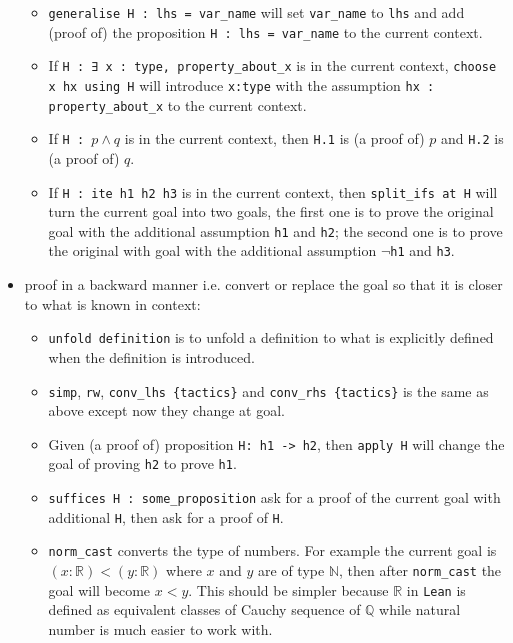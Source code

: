\documentclass{report}
\theoremstyle{definition}
\begin{document}
\begin{itemize}
\begin{itemize}
    \item {\tt \small generalise H : lhs = var\_name} will set {\tt \small var\_name} to {\tt \small lhs} and add (proof of) the proposition {\tt \small H : lhs = var\_name} to the current context.
    \item If {\tt \small H : ∃ x : type, property\_about\_x} is in the current context, {\tt \small choose x hx using H} will introduce {\tt \small x:type} with the assumption {\tt \small hx : property\_about\_x} to the current context. 
    \item If {\tt \small H : $p\land q$} is in the current context, then {\tt \small H.1} is (a proof of) $p$ and {\tt \small H.2} is (a proof of) $q$.
    \item If {\tt \small H : ite h1 h2 h3} is in the current context, then {\tt \small split\_ifs at H} will turn the current goal into two goals, the first one is to prove the original goal with the additional assumption {\tt \small h1} and {\tt \small h2}; the second one is to prove the original with goal with the additional assumption {\tt \small $\neg$h1} and {\tt \small h3}.
  \end{itemize}

  \item proof in a backward manner i.e. convert or replace the goal so that it is closer to what is known in context:
  \begin{itemize}
    \item {\tt \small unfold definition} is to unfold a definition to what is explicitly defined when the definition is introduced.
    \item {\tt \small simp}, {\tt \small rw}, {\tt \small conv\_lhs \{tactics\}} and {\tt \small conv\_rhs \{tactics\}} is the same as above except now they change at goal.
    \item Given (a proof of) proposition {\tt \small H: h1 -> h2}, then {\tt \small apply H} will change the goal of proving {\tt \small h2} to prove {\tt \small h1}.
    \item {\tt \small suffices H : some\_proposition} ask for a proof of the current goal with additional {\tt \small H}, then ask for a proof of {\tt \small H}.
    \item {\tt \small norm\_cast} converts the type of numbers. For example the current goal is $(x:\mathbb R)<(y:\mathbb R)$ where $x$ and $y$ are of type $\mathbb N$, then after {\tt \small norm\_cast} the goal will become $x<y$. This should be simpler because $\mathbb R$ in {\tt \small Lean} is defined as equivalent classes of Cauchy sequence of $\mathbb Q$ while natural number is much easier to work with.
    

\end{itemize}
\end{itemize}
\end{document}
